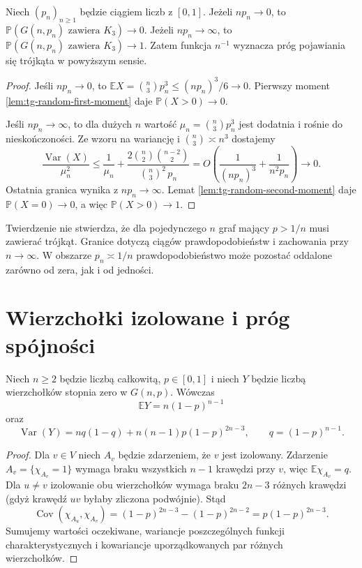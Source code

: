\begin{twierdzenie}
\label{thm:tg-random-triangle-threshold}
Niech $(p_n)_{n\geq1}$ będzie ciągiem liczb z $[0,1]$.
Jeżeli $np_n\to0$, to
$\mathbb P(G(n,p_n)\text{ zawiera }K_3)\to0$.
Jeżeli $np_n\to\infty$, to
$\mathbb P(G(n,p_n)\text{ zawiera }K_3)\to1$.
Zatem funkcja $n^{-1}$
wyznacza próg pojawiania się
trójkąta w powyższym sensie.
\end{twierdzenie}
\begin{proof}
Jeśli $np_n\to0$, to
$\mathbb EX=\binom n3p_n^3
\leq(np_n)^3/6\to0$.
Pierwszy moment
\ref{lem:tg-random-first-moment}
daje $\mathbb P(X>0)\to0$.

Jeśli $np_n\to\infty$,
to dla dużych $n$
wartość $\mu_n=\binom n3p_n^3$
jest dodatnia i rośnie
do nieskończoności.
Ze wzoru na wariancję
i $\binom n3\asymp n^3$
dostajemy
\[
\frac{\operatorname{Var}(X)}{\mu_n^2}
\leq\frac1{\mu_n}
+\frac{2\binom n2\binom{n-2}2}
{\binom n3^2\,p_n}
=O\left(\frac1{(np_n)^3}
+\frac1{n^2p_n}\right)\to0.
\]
Ostatnia granica wynika
z $np_n\to\infty$.
Lemat
\ref{lem:tg-random-second-moment}
daje $\mathbb P(X=0)\to0$,
a więc $\mathbb P(X>0)\to1$.
\end{proof}

\begin{uwaga}
Twierdzenie nie stwierdza,
że dla pojedynczego $n$
graf mający $p>1/n$
musi zawierać trójkąt.
Granice dotyczą ciągów
prawdopodobieństw
i zachowania
przy $n\to\infty$.
W obszarze $p_n\asymp1/n$
prawdopodobieństwo
może pozostać
oddalone zarówno od zera,
jak i od jedności.
\end{uwaga}
\section{Wierzchołki izolowane i próg spójności}
\label{sec:tg-random-connectivity}

\begin{stwierdzenie}
\label{prop:tg-random-isolates}
Niech $n\geq2$ będzie liczbą całkowitą, $p\in[0,1]$
i niech $Y$ będzie liczbą
wierzchołków stopnia zero
w $G(n,p)$. Wówczas
\[
\mathbb EY=n(1-p)^{n-1}
\]
oraz
\[
\operatorname{Var}(Y)=
nq(1-q)+n(n-1)p(1-p)^{2n-3},
\qquad q=(1-p)^{n-1}.
\]
\end{stwierdzenie}
\begin{proof}
Dla $v\in V$ niech $A_v$ będzie zdarzeniem,
że $v$ jest izolowany. Zdarzenie $A_v=\{\chi_{A_v}=1\}$
wymaga braku wszystkich
$n-1$ krawędzi przy $v$,
więc $\mathbb E\chi_{A_v}=q$.
Dla $u\ne v$ izolowanie
obu wierzchołków
wymaga braku $2n-3$
różnych krawędzi
(gdyż krawędź $uv$
byłaby zliczona podwójnie).
Stąd
\[
\operatorname{Cov}(\chi_{A_u},\chi_{A_v})
=(1-p)^{2n-3}-(1-p)^{2n-2}
=p(1-p)^{2n-3}.
\]
Sumujemy wartości oczekiwane,
wariancje poszczególnych
funkcji charakterystycznych i kowariancje
uporządkowanych par
różnych wierzchołków.
\end{proof}

